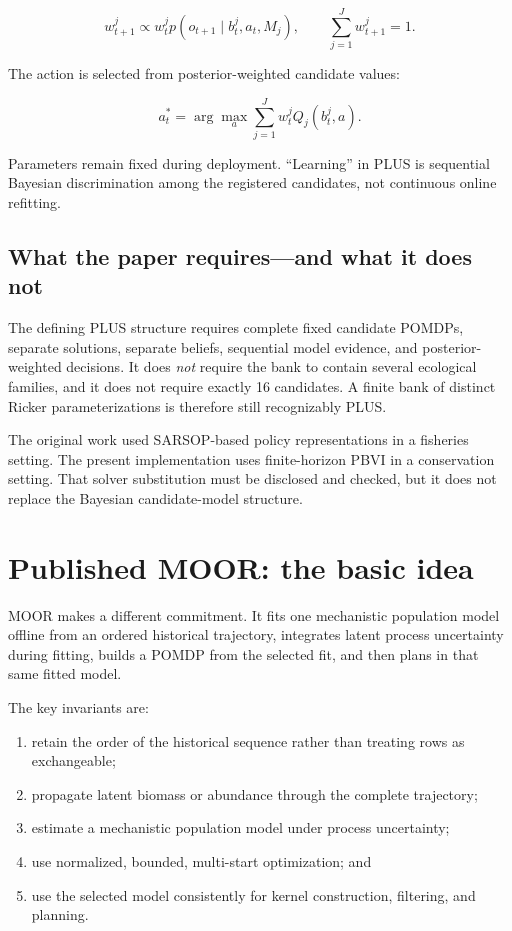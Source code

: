 \documentclass[11pt]{article}
\begin{document}
\begin{equation}
w_{t+1}^j \propto w_t^j
p(o_{t+1}\mid b_t^j,a_t,M_j),
\qquad \sum_{j=1}^J w_{t+1}^j=1.
\end{equation}

The action is selected from posterior-weighted candidate values:

\begin{equation}
a_t^*=\arg\max_a\sum_{j=1}^J w_t^j Q_j(b_t^j,a).
\end{equation}

Parameters remain fixed during deployment. ``Learning'' in PLUS is sequential Bayesian
discrimination among the registered candidates, not continuous online refitting.

\subsection{What the paper requires---and what it does not}

The defining PLUS structure requires complete fixed candidate POMDPs, separate solutions, separate
beliefs, sequential model evidence, and posterior-weighted decisions. It does \emph{not} require
the bank to contain several ecological families, and it does not require exactly 16 candidates.
A finite bank of distinct Ricker parameterizations is therefore still recognizably PLUS.

The original work used SARSOP-based policy representations in a fisheries setting. The present
implementation uses finite-horizon PBVI in a conservation setting. That solver substitution must be
disclosed and checked, but it does not replace the Bayesian candidate-model structure.

\section{Published MOOR: the basic idea}

MOOR makes a different commitment. It fits one mechanistic population model offline from an ordered
historical trajectory, integrates latent process uncertainty during fitting, builds a POMDP from the
selected fit, and then plans in that same fitted model.

The key invariants are:

\begin{enumerate}
  \item retain the order of the historical sequence rather than treating rows as exchangeable;
  \item propagate latent biomass or abundance through the complete trajectory;
  \item estimate a mechanistic population model under process uncertainty;
  \item use normalized, bounded, multi-start optimization; and
  \item use the selected model consistently for kernel construction, filtering, and planning.
\end{enumerate}
\end{document}
